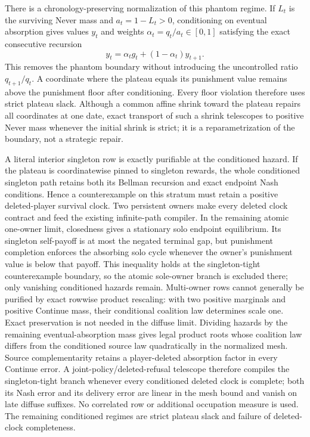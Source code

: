\documentclass[11pt]{article}
\begin{document}
There is a chronology-preserving normalization of this phantom regime.  If
\(L_t\) is the surviving Never mass and \(a_t=1-L_t>0\), conditioning on
eventual absorption gives values \(y_t\) and weights
\(\alpha_t=q_t/a_t\in[0,1]\) satisfying the exact consecutive recursion
\[
 y_t=\alpha_t g_t+(1-\alpha_t)y_{t+1}.
\]
This removes the phantom boundary without introducing the uncontrolled ratio
\(q_{t+1}/q_t\).  A coordinate where the plateau equals its punishment value
remains above the punishment floor after conditioning.  Every floor violation
therefore uses strict plateau slack.  Although a common affine shrink toward
the plateau repairs all coordinates at one date, exact transport of such a
shrink telescopes to positive Never mass whenever the initial shrink is
strict; it is a reparametrization of the boundary, not a strategic repair.

A literal interior singleton row is exactly purifiable at the conditioned
hazard.  If the plateau is coordinatewise pinned to singleton rewards, the
whole conditioned singleton path retains both its Bellman recursion and exact
endpoint Nash conditions.  Hence a counterexample on this stratum must retain
a positive deleted-player survival clock.  Two persistent owners make every
deleted clock contract and feed the existing infinite-path compiler.  In the
remaining atomic one-owner limit, closedness gives a stationary solo endpoint
equilibrium.  Its singleton self-payoff is at most the negated terminal gap,
but punishment completion enforces the absorbing solo cycle whenever the
owner's punishment value is below that payoff.  This inequality holds at the
singleton-tight counterexample boundary, so the atomic sole-owner branch is
excluded there; only vanishing conditioned hazards remain.  Multi-owner rows
cannot generally be purified by exact rowwise product
rescaling: with two positive marginals and positive Continue mass, their
conditional coalition law determines scale one.  Exact preservation is not
needed in the diffuse limit.  Dividing hazards by the remaining
eventual-absorption mass gives legal product roots whose coalition law differs
from the conditioned source law quadratically in the normalized mesh.  Source
complementarity retains a player-deleted absorption factor in every Continue
error.  A joint-policy/deleted-refusal telescope therefore compiles the
singleton-tight branch whenever every conditioned deleted clock is complete;
both its Nash error and its delivery error are linear in the mesh bound and
vanish on late diffuse suffixes.  No correlated row or additional occupation
measure is used.  The remaining conditioned regimes are strict plateau slack
and failure of deleted-clock completeness.
\end{document}
